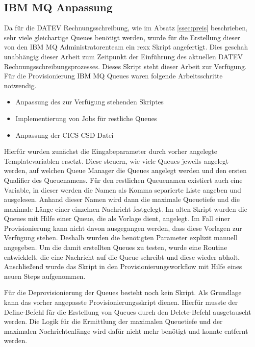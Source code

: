 \subsection{IBM MQ Anpassung}\label{ssec:mqentw}
Da für die DATEV Rechnungsschreibung, wie im Absatz \ref{ssec:preis} beschrieben, sehr viele gleichartige Queues benötigt werden, wurde für die Erstellung dieser von den IBM MQ Administratorenteam ein \Gls{rexx} Skript angefertigt.
Dies geschah unabhängig dieser Arbeit zum Zeitpunkt der Einführung des aktuellen DATEV Rechnungsschreibungsprozesses.
Dieses Skript steht dieser Arbeit zur Verfügung.
Für die Provisionierung IBM MQ Queues waren folgende Arbeitsschritte notwendig.

\begin{samepage}
\begin{itemize}
\item Anpassung des zur Verfügung stehenden Skriptes
\item Implementierung von Jobs für restliche Queues
\item Anpassung der CICS CSD Datei
\end{itemize}
\end{samepage}

Hierfür wurden zunächst die Eingabeparameter durch vorher angelegte Templatevariablen ersetzt.
Diese steuern, wie viele Queues jeweils angelegt werden, auf welchen Queue Manager die Queues angelegt werden und den ersten Qualifier des Queuenamens.
Für den restlichen Queuenamen existiert auch eine Variable, in dieser werden die Namen als Komma separierte Liste angeben und ausgelesen.
Anhand dieser Namen wird dann die maximale Queuetiefe und die maximale Länge einer einzelnen Nachricht festgelegt.
Im alten Skript wurden die Queues mit Hilfe einer Queue, die als Vorlage dient, angelegt.
Im Fall einer Provisionierung kann nicht davon ausgegangen werden, dass diese Vorlagen zur Verfügung stehen.
Deshalb wurden die benötigten Parameter explizit manuell angegeben.
Um die damit erstellten Queues zu testen, wurde eine Routine entwicklelt, die eine Nachricht auf die Queue schreibt und diese wieder abholt.
Anschließend wurde das Skript in den Provisionierungsworkflow mit Hilfe eines neuen Steps aufgenommen.

Für die Deprovisionierung der Queues besteht noch kein Skript.
Als Grundlage kann das vorher angepasste Provisionierungsskript dienen.
Hierfür musste der \glqq Define\grqq-Befehl für die Erstellung von Queues durch den \glqq Delete\grqq-Befehl ausgetauscht werden.
Die Logik für die Ermittlung der maximalen Queuetiefe und der maximalen Nachrichtenlänge wird dafür nicht mehr benötigt und konnte entfernt werden.

